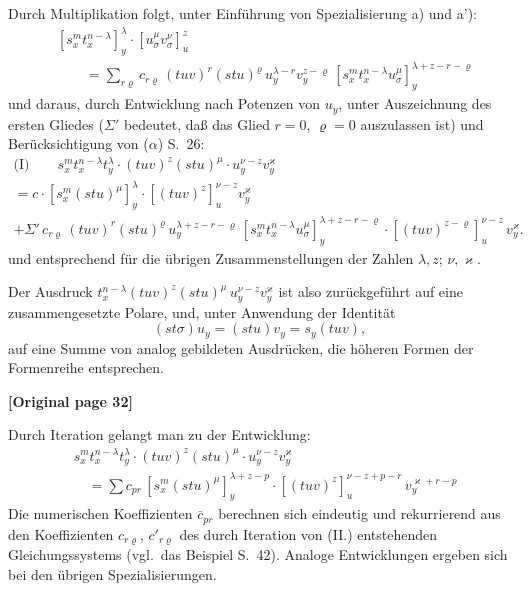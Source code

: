 \documentclass[12pt,a4paper]{article}
\begin{document}
Durch Multiplikation folgt, unter Einführung von Spezialisierung a) und a'):
\begin{equation}\tag{II.}
\begin{aligned}
&[s_x^m t_x^{n-\lambda}]_y^\lambda \cdot [u_\sigma^\mu v_\sigma^\nu]_u^z \\
&\qquad = \sum_{r\varrho} c_{r\varrho} \, (tuv)^r (stu)^\varrho \, u_y^{\lambda-r} v_y^{z-\varrho} \, [s_x^m t_x^{n-\lambda} u_\sigma^\mu]_y^{\lambda+z-r-\varrho}
\end{aligned}
\end{equation}
und daraus, durch Entwicklung nach Potenzen von $u_y$, unter Auszeichnung
des ersten Gliedes ($\Sigma'$ bedeutet, daß das Glied $r=0$, $\varrho=0$ auszulassen ist)
und Berücksichtigung von ($\alpha$) S.~26:
\begin{multline*}
\text{(I)} \qquad s_x^m t_x^{n-\lambda} t_y^\lambda \cdot (tuv)^z (stu)^\mu \cdot u_y^{\nu-z} v_y^{\varkappa} \\
= c \cdot [s_x^m (stu)^\mu]_y^\lambda \cdot [(tuv)^z]_u^{\nu-z} v_y^\varkappa \\
+ \Sigma' \, c_{r\varrho} \, (tuv)^r (stu)^\varrho \, u_y^{\lambda+z-r-\varrho} \, [s_x^m t_x^{n-\lambda} u_\sigma^\mu]_y^{\lambda+z-r-\varrho} \cdot [(tuv)^{z-\varrho}]_u^{\nu-z} \, v_y^\varkappa.
\end{multline*}
und entsprechend für die übrigen Zusammenstellungen der Zahlen $\lambda,z$; $\nu,\varkappa$.

Der Ausdruck $t_x^{n-\lambda} (tuv)^z (stu)^\mu \, u_y^{\nu-z} v_y^\varkappa$ ist also zurückgeführt auf eine zusammengesetzte Polare, und, unter Anwendung der Identität
\[(st\sigma) u_y = (stu) v_y = s_y (tuv),\]
auf eine Summe von analog gebildeten Ausdrücken, die höheren Formen der Formenreihe entsprechen.

\noindent\textbf{[Original page 32]}

Durch Iteration gelangt man zu der Entwicklung:
\begin{equation}\tag{III.}
\begin{aligned}
&s_x^m t_x^{n-\lambda} t_y^\lambda \cdot (tuv)^z (stu)^\mu \cdot u_y^{\nu-z} v_y^\varkappa \\
&\quad = \sum c_{pr} \, [s_x^m (stu)^\mu]_y^{\lambda+z-p} \cdot [(tuv)^z]_u^{\nu-z+p-r} \, v_y^{\varkappa+r-p}
\end{aligned}
\end{equation}
Die numerischen Koeffizienten $\bar{c}_{pr}$ berechnen sich eindeutig und rekurrierend
aus den Koeffizienten $c_{r\varrho}$, $c'_{r\varrho}$ des durch Iteration von (II.) entstehenden Gleichungssystems (vgl.\ das Beispiel S.~42).
Analoge Entwicklungen ergeben sich bei den übrigen Spezialisierungen.
\end{document}
